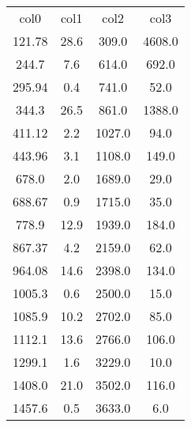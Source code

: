 \begin{table}
\begin{tabular}{cccc}
col0 & col1 & col2 & col3 \\
121.78 & 28.6 & 309.0 & 4608.0 \\
244.7 & 7.6 & 614.0 & 692.0 \\
295.94 & 0.4 & 741.0 & 52.0 \\
344.3 & 26.5 & 861.0 & 1388.0 \\
411.12 & 2.2 & 1027.0 & 94.0 \\
443.96 & 3.1 & 1108.0 & 149.0 \\
678.0 & 2.0 & 1689.0 & 29.0 \\
688.67 & 0.9 & 1715.0 & 35.0 \\
778.9 & 12.9 & 1939.0 & 184.0 \\
867.37 & 4.2 & 2159.0 & 62.0 \\
964.08 & 14.6 & 2398.0 & 134.0 \\
1005.3 & 0.6 & 2500.0 & 15.0 \\
1085.9 & 10.2 & 2702.0 & 85.0 \\
1112.1 & 13.6 & 2766.0 & 106.0 \\
1299.1 & 1.6 & 3229.0 & 10.0 \\
1408.0 & 21.0 & 3502.0 & 116.0 \\
1457.6 & 0.5 & 3633.0 & 6.0 \\
\end{tabular}
\end{table}

